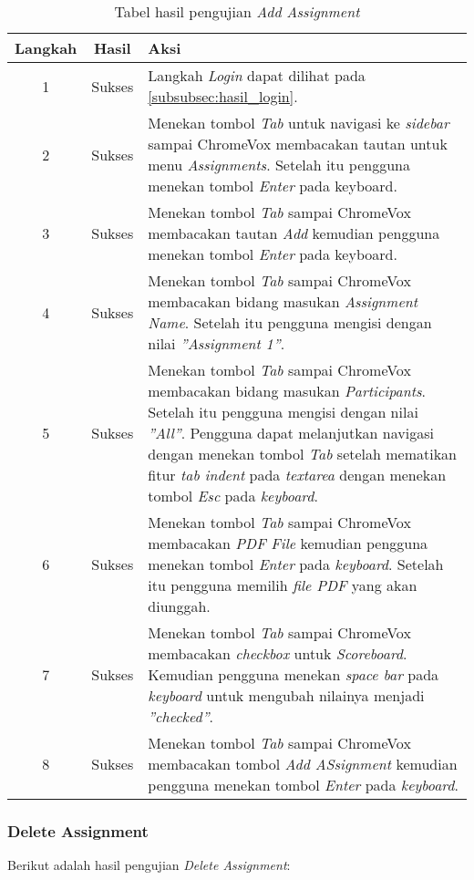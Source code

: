 \begin{table}[H]
	\centering
	\caption{Tabel hasil pengujian \textit{Add Assignment}}
	\label{tab:hasil_add_assignment}
	\begin{tabular}{|c|c|p{12cm}|}
		\toprule
		Langkah & Hasil & Aksi\\
		\midrule
		1 & Sukses & Langkah \textit{Login} dapat dilihat pada \ref{subsubsec:hasil_login}.\\
		2 & Sukses & Menekan tombol \textit{Tab} untuk navigasi ke \textit{sidebar} sampai ChromeVox membacakan tautan untuk menu \textit{Assignments}. Setelah itu pengguna menekan tombol \textit{Enter} pada keyboard.\\
		3 & Sukses & Menekan tombol \textit{Tab} sampai ChromeVox membacakan tautan \textit{Add} kemudian pengguna menekan tombol \textit{Enter} pada keyboard.\\
		4 & Sukses & Menekan tombol \textit{Tab} sampai ChromeVox membacakan bidang masukan \textit{Assignment Name}. Setelah itu pengguna mengisi dengan nilai \textit{''Assignment 1''}.\\
		5 & Sukses & Menekan tombol \textit{Tab} sampai ChromeVox membacakan bidang masukan \textit{Participants}. Setelah itu pengguna mengisi dengan nilai \textit{''All''}. Pengguna dapat melanjutkan navigasi dengan menekan tombol \textit{Tab} setelah mematikan fitur \textit{tab indent} pada \textit{textarea} dengan menekan tombol \textit{Esc} pada \textit{keyboard}.\\
		6 & Sukses & Menekan tombol \textit{Tab} sampai ChromeVox membacakan \textit{PDF File} kemudian pengguna menekan tombol \textit{Enter} pada \textit{keyboard}. Setelah itu pengguna memilih \textit{file PDF} yang akan diunggah.\\
		7 & Sukses & Menekan tombol \textit{Tab} sampai ChromeVox membacakan \textit{checkbox} untuk \textit{Scoreboard}. Kemudian pengguna menekan \textit{space bar} pada \textit{keyboard} untuk mengubah nilainya menjadi \textit{''checked''}.\\
		8 & Sukses & Menekan tombol \textit{Tab} sampai ChromeVox membacakan tombol \textit{Add ASsignment} kemudian pengguna menekan tombol \textit{Enter} pada \textit{keyboard}.\\
		\bottomrule
	\end{tabular}
\end{table}

\subsubsection{Delete Assignment}
\label{subsubsec:hasil_delete_assignment}
Berikut adalah hasil pengujian \textit{Delete Assignment}:


